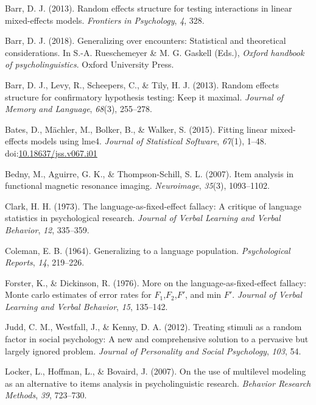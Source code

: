 \documentclass[doc,floatsintext]{apa6}
\begin{document}
\hypertarget{ref-barr_2013}{}
Barr, D. J. (2013). Random effects structure for testing interactions in
linear mixed-effects models. \emph{Frontiers in Psychology}, \emph{4},
328.

\hypertarget{ref-barr_2018}{}
Barr, D. J. (2018). Generalizing over encounters: Statistical and
theoretical considerations. In S.-A. Rueschemeyer \& M. G. Gaskell
(Eds.), \emph{Oxford handbook of psycholinguistics}. Oxford University
Press.

\hypertarget{ref-barr_et_al_2013}{}
Barr, D. J., Levy, R., Scheepers, C., \& Tily, H. J. (2013). Random
effects structure for confirmatory hypothesis testing: Keep it maximal.
\emph{Journal of Memory and Language}, \emph{68}(3), 255--278.

\hypertarget{ref-R-lme4}{}
Bates, D., Mächler, M., Bolker, B., \& Walker, S. (2015). Fitting linear
mixed-effects models using lme4. \emph{Journal of Statistical Software},
\emph{67}(1), 1--48.
doi:\href{https://doi.org/10.18637/jss.v067.i01}{10.18637/jss.v067.i01}

\hypertarget{ref-bedny_aguirre_thompson-schill_2007}{}
Bedny, M., Aguirre, G. K., \& Thompson-Schill, S. L. (2007). Item
analysis in functional magnetic resonance imaging. \emph{Neuroimage},
\emph{35}(3), 1093--1102.

\hypertarget{ref-clark_1973}{}
Clark, H. H. (1973). The language-as-fixed-effect fallacy: A critique of
language statistics in psychological research. \emph{Journal of Verbal
Learning and Verbal Behavior}, \emph{12}, 335--359.

\hypertarget{ref-coleman_1964}{}
Coleman, E. B. (1964). Generalizing to a language population.
\emph{Psychological Reports}, \emph{14}, 219--226.

\hypertarget{ref-forster_dickinson_1976}{}
Forster, K., \& Dickinson, R. (1976). More on the
language-as-fixed-effect fallacy: Monte carlo estimates of error rates
for \(F_1\),\(F_2\),\(F'\), and min \(F'\). \emph{Journal of Verbal
Learning and Verbal Behavior}, \emph{15}, 135--142.

\hypertarget{ref-judd_westfall_kenny_2012}{}
Judd, C. M., Westfall, J., \& Kenny, D. A. (2012). Treating stimuli as a
random factor in social psychology: A new and comprehensive solution to
a pervasive but largely ignored problem. \emph{Journal of Personality
and Social Psychology}, \emph{103}, 54.

\hypertarget{ref-locker_hoffman_bovaird_2007}{}
Locker, L., Hoffman, L., \& Bovaird, J. (2007). On the use of multilevel
modeling as an alternative to items analysis in psycholinguistic
research. \emph{Behavior Research Methods}, \emph{39}, 723--730.
\end{document}
